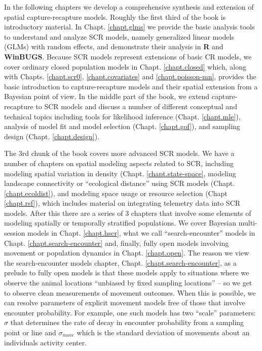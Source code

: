In the following chapters we develop a comprehensive synthesis and
extension of spatial capture-recapture models.  Roughly the first
third of the book is introductory material. In Chapt. \ref{chapt.glms}
we provide the basic analysis tools to understand and analyze SCR
models, namely generalized linear models (GLMs) with random effects,
and demonstrate their analysis in {\bf R} and {\bf WinBUGS}.  Because SCR models
represent extensions of basic %
CR models, we cover
ordinary closed population models in Chapt. \ref{chapt.closed}
which,
along with Chapts. \ref{chapt.scr0}, \ref{chapt.covariates}
and \ref{chapt.poisson-mn}, provides the basic introduction to
capture-recapture models and their spatial extension from a Bayesian
point of view.  
In the middle part of the book, we extend
capture-recapture to SCR models and discuss a number of different
conceptual and technical topics including tools for likelihood
inference (Chapt. \ref{chapt.mle}), analysis of model fit and model
selection (Chapt. \ref{chapt.gof}), and sampling design
(Chapt. \ref{chapt.design}).

The 3rd chunk of the book covers more advanced SCR models.  We have a
number of chapters on spatial modeling aspects related to SCR,
including modeling spatial variation in density
(Chapt. \ref{chapt.state-space}, modeling landscape connectivity or
``ecological distance'' using SCR models
(Chapt. \ref{chapt.ecoldist}), and modeling space usage or resource
selection (Chapt \ref{chapt.rsf}), which includes material on
integrating telemetry data into SCR models.  After this there are a
series of 3 chapters that involve some elements of modeling spatially
or temporally stratified populations.  We cover Bayesian multi-session
models in Chapt. \ref{chapt.hscr}, what we call
``search-encounter'' models in Chapt. \ref{chapt.search-encounter}
and, finally, fully open models involving movement or population
dynamics in Chapt. \ref{chapt.open}.  The reason we view the
search-encounter models chapter, Chapt. \ref{chapt.search-encounter},
as a prelude to fully open models is that these models apply to
situations where we observe the animal locations ``unbiased by fixed
sampling locations'' -- so we get to observe clean measurements of
movement outcomes. When this is possible, we can resolve parameters of
explicit movement models free of those that involve encounter
probability.  For example, one such models has two ``scale''
parameters: $\sigma$ that determines the rate of decay in encounter
probability from a sampling point or line and $\sigma_{move}$
which is
the standard deviation of movements about an individuals activity
center.

